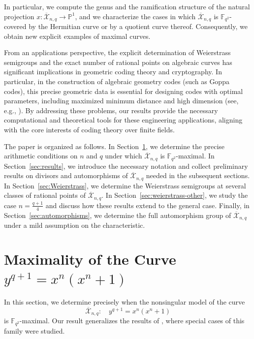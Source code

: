 \documentclass[12pt]{amsart}
\theoremstyle{remark}
\theoremstyle{definition}
\begin{document}
	In particular, we compute the genus and the ramification structure of 
the natural projection $x \colon \overline{\mathcal{X}}_{n,q} \to 
\mathbb{P}^1$, and we characterize the cases in which 
$\overline{\mathcal{X}}_{n,q}$ is $\mathbb{F}_{q^2}$-covered by the 
Hermitian curve or by a quotient curve thereof. Consequently, we 
obtain new explicit examples of maximal curves.

    From an applications perspective, the explicit determination of Weierstrass semigroups and the exact number of rational points on algebraic curves has significant implications in geometric coding theory and cryptography. In particular, in the construction of algebraic geometry codes (such as Goppa codes), this precise geometric data is essential for designing codes with optimal parameters, including maximized minimum distance and high dimension (see, e.g., \cite{stichtenoth}). By addressing these problems, our results provide the necessary computational and theoretical tools for these engineering applications, aligning with the core interests of coding theory over finite fields.
	
	
	The paper is organized as follows. In 
Section~\ref{sec:maximality}, we determine the precise arithmetic 
conditions on $n$ and $q$ under which $\overline{\mathcal{X}}_{n,q}$ 
is $\mathbb{F}_{q^2}$-maximal. In Section~\ref{sec:results}, we 
introduce the necessary notation and collect preliminary results on 
divisors and automorphisms of $\overline{\mathcal{X}}_{n,q}$ needed 
in the subsequent sections. In Section~\ref{sec:Weierstrass}, we 
determine the Weierstrass semigroups at several classes of rational 
points of $\overline{\mathcal{X}}_{n,q}$. In 
Section~\ref{sec:weierstrass-other}, we study the case $n = \frac{q+1}{4}$ and 
discuss how these results extend to the general case. Finally, in 
Section~\ref{sec:automorphisms}, we determine the full automorphism 
group of $\overline{\mathcal{X}}_{n,q}$ under a mild assumption on 
the characteristic.

	\section{\texorpdfstring{Maximality of the Curve $y^{q+1} = x^{n}(x^{n}+1)$}
{Maximality of the Curve}}\label{sec:maximality}

In this section, we determine precisely when the nonsingular model 
of the curve
\[
\overline{\mathcal{X}}_{n,q} :\quad y^{q+1} = x^{n}(x^{n}+1)
\]
is $\mathbb{F}_{q^2}$-maximal. Our result generalizes the results 
of \cite{TT1,TT2}, where special cases of this family were studied.
\end{document}
